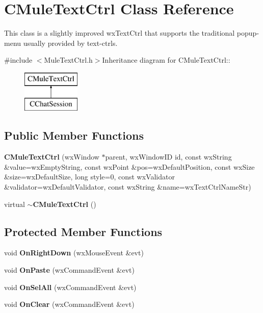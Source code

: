 \section{CMuleTextCtrl Class Reference}
\label{classCMuleTextCtrl}


This class is a slightly improved wxTextCtrl that supports the traditional popup-\/menu usually provided by text-\/ctrls.  


{\ttfamily \#include $<$MuleTextCtrl.h$>$}Inheritance diagram for CMuleTextCtrl::\begin{figure}[H]
\begin{center}
\leavevmode
\includegraphics[height=2cm]{classCMuleTextCtrl}
\end{center}
\end{figure}
\subsection*{Public Member Functions}
\begin{DoxyCompactItemize}
\item 
{\bf CMuleTextCtrl} (wxWindow $\ast$parent, wxWindowID id, const wxString \&value=wxEmptyString, const wxPoint \&pos=wxDefaultPosition, const wxSize \&size=wxDefaultSize, long style=0, const wxValidator \&validator=wxDefaultValidator, const wxString \&name=wxTextCtrlNameStr)\label{classCMuleTextCtrl_a833ca73effed293dec68c975213acfeb}

\item 
virtual {\bf $\sim$CMuleTextCtrl} ()\label{classCMuleTextCtrl_a3f93d90f932fc66be3017878c23eb8be}

\end{DoxyCompactItemize}
\subsection*{Protected Member Functions}
\begin{DoxyCompactItemize}
\item 
void {\bf OnRightDown} (wxMouseEvent \&evt)
\item 
void {\bf OnPaste} (wxCommandEvent \&evt)
\item 
void {\bf OnSelAll} (wxCommandEvent \&evt)\label{classCMuleTextCtrl_ae9a4c3858e5e80a824531ce84d777a1f}

\item 
void {\bf OnClear} (wxCommandEvent \&evt)\label{classCMuleTextCtrl_ac6825a447dc49d6d3996f2eff95e8a63}

\end{DoxyCompactItemize}


